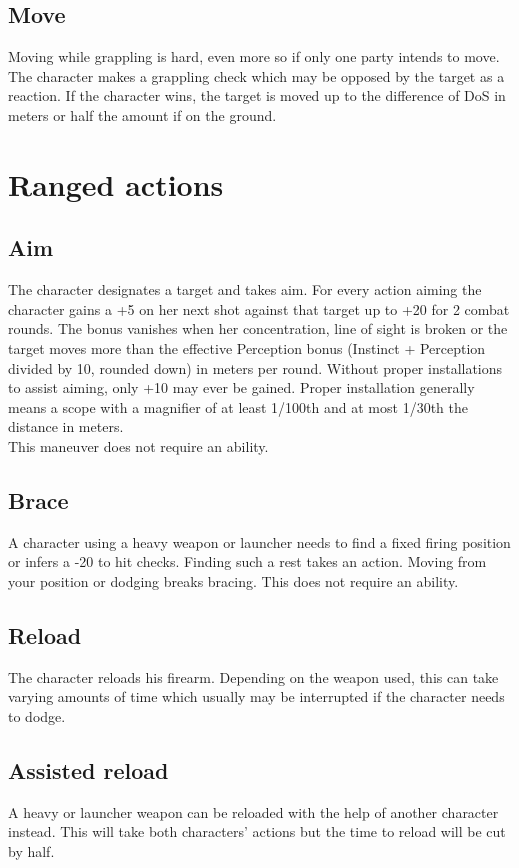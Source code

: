 \documentclass[12pt,a4paper]{book}
\begin{document}
	\subsection*{Move}
	Moving while grappling is hard, even more so if only one party intends to move.\\
	The character makes a grappling check which may be opposed by the target as a reaction. If the character wins, the target is moved up to the difference of DoS in meters or half the amount if on the ground.
	\section{Ranged actions}
	\subsection*{Aim}
	The character designates a target and takes aim. For every action aiming the character gains a +5 on her next shot against that target up to +20 for 2 combat rounds. The bonus vanishes when her concentration, line of sight is broken or the target moves more than the effective Perception bonus (Instinct + Perception divided by 10, rounded down) in meters per round. Without proper installations to assist aiming, only +10 may ever be gained. Proper installation generally means a scope with a magnifier of at least 1/100th and at most 1/30th the distance in meters.\\
	This maneuver does not require an ability.
	\subsection*{Brace}
	A character using a heavy weapon or launcher needs to find a fixed firing position or infers a -20 to hit checks. Finding such a rest takes an action. Moving from your position or dodging breaks bracing. This does not require an ability.
	\subsection*{Reload}
	The character reloads his firearm. Depending on the weapon used, this can take varying amounts of time which usually may be interrupted if the character needs to dodge.
	\subsection*{Assisted reload}
	A heavy or launcher weapon can be reloaded with the help of another character instead. This will take both characters’ actions but the time to reload will be cut by half.
\end{document}
